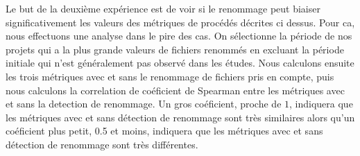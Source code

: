 Le but de la deuxième expérience est de voir si le renommage peut biaiser significativement les valeurs des métriques de procédés décrites ci dessus. Pour ca, nous effectuons une analyse dans le pire des cas. On sélectionne la période de nos projets qui a la plus grande valeurs de fichiers renommés en excluant la période initiale qui n'est généralement pas observé dans les études. Nous calculons ensuite les trois métriques avec et sans le renommage de fichiers pris en compte, puis nous calculons la correlation de coéficient de Spearman entre les métriques avec et sans la detection de renommage. Un gros coéficient, proche de $1$, indiquera que les métriques avec et sans détection de renommage sont très similaires alors qu'un coéficient plus petit, 0.5 et moins, indiquera que les métriques avec et sans détection de renommage sont très différentes.\\
